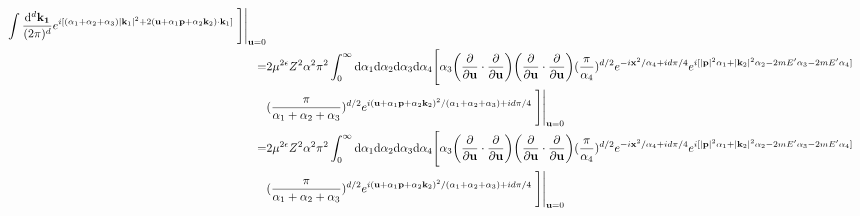 \documentclass[aps,prd,preprint,showkeys,notitlepage,10pt]{revtex4-1}
\newcommand{\vbp}{\vb{p}}
\newcommand{\vbk}{\vb{k}}
\renewcommand{\a}{\alpha}
\begin{document}
\begin{align*}
	\int\frac{\dd^d\vb{k_1}}{(2\pi)^d}e^{i[(\a_1+\a_2+\a_3)\abs{\vbk_1}^2+2(\vb{u}+\a_1\vbp+\a_2\vbk_2)\cdot\vbk_1]} \eval{\Bigg]}_{\vb{u}=0}\\
	= & 2\mu^{2\epsilon}Z^2\a^2\pi^2
	\int_0^{\infty}\dd\a_1\dd\a_2\dd\a_3\dd\a_4\Bigg[\a_3\pqty{\pdv{\vb{u}}\cdot\pdv{\vb{u}}}\pqty{\pdv{\vb{u}}\cdot\pdv{\vb{u}}}
	(\frac{\pi}{\a_4})^{d/2}e^{-i\vb{x}^2/{\a_4}+id\pi/4}
	e^{i[\abs{\vbp}^2\a_1+\abs{\vbk_2}^2\a_2-2mE'\a_3-2mE'\a_4]}\\&
	(\frac{\pi}{\a_1+\a_2+\a_3})^{d/2}e^{i(\vb{u}+\a_1\vbp+\a_2\vbk_2)^2/(\a_1+\a_2+\a_3)+id\pi/4}\eval{\Bigg]}_{\vb{u}=0}\\
	= & 2\mu^{2\epsilon}Z^2\a^2\pi^2
	\int_0^{\infty}\dd\a_1\dd\a_2\dd\a_3\dd\a_4\Bigg[\a_3\pqty{\pdv{\vb{u}}\cdot\pdv{\vb{u}}}\pqty{\pdv{\vb{u}}\cdot\pdv{\vb{u}}}
	(\frac{\pi}{\a_4})^{d/2}e^{-i\vb{x}^2/{\a_4}+id\pi/4}
	e^{i[\abs{\vbp}^2\a_1+\abs{\vbk_2}^2\a_2-2mE'\a_3-2mE'\a_4]}\\&
	(\frac{\pi}{\a_1+\a_2+\a_3})^{d/2}e^{i(\vb{u}+\a_1\vbp+\a_2\vbk_2)^2/(\a_1+\a_2+\a_3)+id\pi/4}\eval{\Bigg]}_{\vb{u}=0}
\end{align*}
\end{document}
